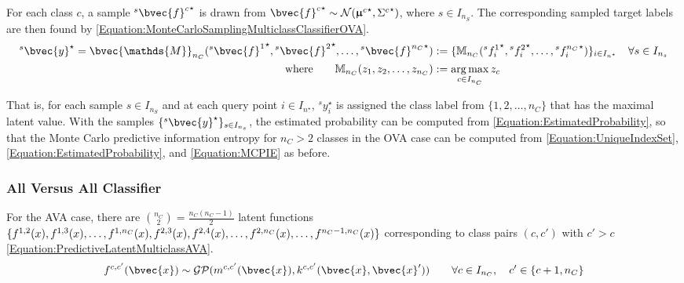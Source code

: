 				For each class $c$, a sample ${^{s}}{\bvec{f}^{c}}^{\star}$ is drawn from ${\bvec{f}^{c}}^{\star} \sim \mathcal{N}({\vec{\upmu}^{c}}^{\star}, {\Sigma^{c}}^{\star})$, where $s \in I_{n_{S}}$. The corresponding sampled target labels are then found by \eqref{Equation:MonteCarloSamplingMulticlassClassifierOVA}. \begin{equation}
					\begin{aligned}
						{^{s}}\bvec{y}^{\star} = \bvec{\mathds{M}}_{n_{C}}({^{s}}{\bvec{f}^{1}}^{\star}, {^{s}}{\bvec{f}^{2}}^{\star}, \dots, {^{s}}{\bvec{f}^{n_{C}}}^{\star}) &:= \{\mathbb{M}_{n_{C}}({^{s}}{f^{1}_{i}}^{\star}, {^{s}}{f^{2}_{i}}^{\star}, \dots, {^{s}}{f^{n_{C}}_{i}}^{\star})\}_{i \in I_{n^{\star}}} \quad \forall s \in I_{n_{s}} \\
						\mathrm{where} \qquad \mathbb{M}_{n_{C}}(z_{1}, z_{2}, \dots, z_{n_{C}}) &:= \argmax_{c \in I_{n_{C}}} z_{c}
					\end{aligned}
				\label{Equation:MonteCarloSamplingMulticlassClassifierOVA}
				\end{equation}
				
				That is, for each sample $s \in I_{n_{S}}$ and at each query point $i \in I_{n^{\star}}$, ${^{s}}y^{\star}_{i}$ is assigned the class label from $\{1, 2, \dots, n_{C}\}$ that has the maximal latent value. With the samples $\{{^{s}}\bvec{y}^{\star}\}_{s \in I_{n_{s}}}$, the estimated probability can be computed from \eqref{Equation:EstimatedProbability}, so that the Monte Carlo predictive information entropy for $n_{C} > 2$ classes in the OVA case can be computed from \eqref{Equation:UniqueIndexSet}, \eqref{Equation:EstimatedProbability}, and \eqref{Equation:MCPIE} as before.
			
			\subsubsection{All Versus All Classifier}
			\label{InformativeSeafloorExploration:MCPIE:Multiclass:All}
			
				For the AVA case, there are ${n_{C} \choose 2} = \frac{n_{C} (n_{C} - 1)}{2}$ latent functions $\{f^{1, 2}(x), f^{1, 3}(x), \dots, \\ f^{1, n_{C}}(x), f^{2, 3}(x), f^{2, 4}(x), \dots, f^{2, n_{C}}(x), \dots, f^{n_{C} - 1, n_{C}}(x)\}$ corresponding to class pairs $(c, c')$ with $c' > c$ \eqref{Equation:PredictiveLatentMulticlassAVA}. \begin{equation}
					f^{c, c'}(\bvec{x}) \sim \mathcal{GP}(m^{c, c'}(\bvec{x}), k^{c, c'}(\bvec{x}, \bvec{x}')) \qquad \forall c \in I_{n_{C}}, \quad c' \in \{c + 1, n_{C}\}
				\label{Equation:PredictiveLatentMulticlassAVA}
				\end{equation}
			
